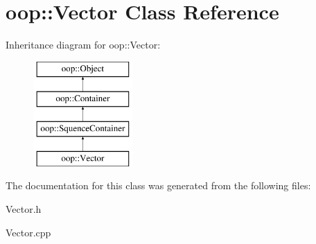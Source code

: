 \hypertarget{classoop_1_1Vector}{\section{oop\-:\-:\-Vector \-Class \-Reference}
\label{classoop_1_1Vector}
}
\-Inheritance diagram for oop\-:\-:\-Vector\-:\begin{figure}[H]
\begin{center}
\leavevmode
\includegraphics[height=4.000000cm]{classoop_1_1Vector}
\end{center}
\end{figure}


\-The documentation for this class was generated from the following files\-:\begin{DoxyCompactItemize}
\item 
\-Vector.\-h\item 
\-Vector.\-cpp\end{DoxyCompactItemize}

